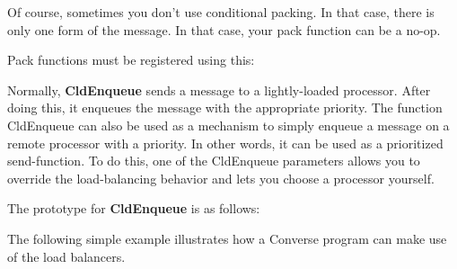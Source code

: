 Of course, sometimes you don't use conditional packing.  In that case,
there is only one form of the message.  In that case, your pack
function can be a no-op.

Pack functions must be registered using this:


Normally, {\bf CldEnqueue} sends a message to a lightly-loaded
processor.  After doing this, it enqueues the message with the
appropriate priority.  The function CldEnqueue can also be used
as a mechanism to simply enqueue a message on a remote processor with
a priority.  In other words, it can be used as a prioritized
send-function.  To do this, one of the CldEnqueue parameters
allows you to override the load-balancing behavior and lets you choose
a processor yourself.

The prototype for {\bf CldEnqueue} is as follows:


The following simple example illustrates how a Converse program can
make use of the load balancers.


